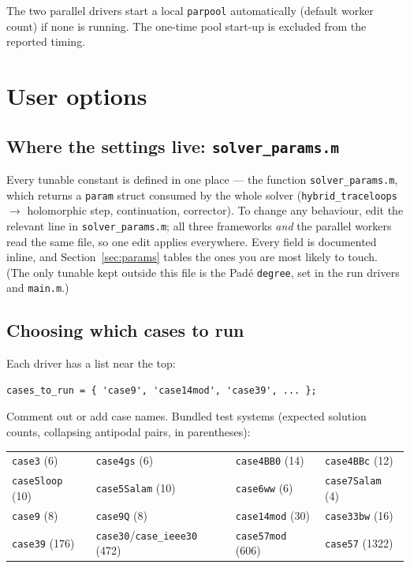 \documentclass[11pt,a4paper]{article}
\newcommand{\code}[1]{\texttt{#1}}
\begin{document}
The two parallel drivers start a local \code{parpool} automatically (default worker
count) if none is running. The one-time pool start-up is excluded from the reported
timing.

\section{User options}

\subsection{Where the settings live: \code{solver_params.m}}
Every tunable constant is defined in one place --- the function \code{solver_params.m},
which returns a \code{param} struct consumed by the whole solver (\code{hybrid_traceloops}
$\to$ holomorphic step, continuation, corrector). To change any behaviour, edit the
relevant line in \code{solver_params.m}; all three frameworks \emph{and} the parallel
workers read the same file, so one edit applies everywhere. Every field is documented
inline, and Section~\ref{sec:params} tables the ones you are most likely to touch. (The
only tunable kept outside this file is the Pad\'e \code{degree}, set in the run drivers and
\code{main.m}.)

\subsection{Choosing which cases to run}
Each driver has a list near the top:
\begin{lstlisting}[style=mat]
cases_to_run = { 'case9', 'case14mod', 'case39', ... };
\end{lstlisting}
Comment out or add case names. Bundled test systems (expected solution counts, collapsing
antipodal pairs, in parentheses):

\begin{center}\small
\begin{tabular}{@{}llll@{}}
\toprule
\code{case3} (6) & \code{case4gs} (6) & \code{case4BB0} (14) & \code{case4BBc} (12)\\
\code{case5loop} (10) & \code{case5Salam} (10) & \code{case6ww} (6) & \code{case7Salam} (4)\\
\code{case9} (8) & \code{case9Q} (8) & \code{case14mod} (30) & \code{case33bw} (16)\\
\code{case39} (176) & \code{case30}/\code{case_ieee30} (472) & \code{case57mod} (606) & \code{case57} (1322)\\
\bottomrule
\end{tabular}
\end{center}
\end{document}

